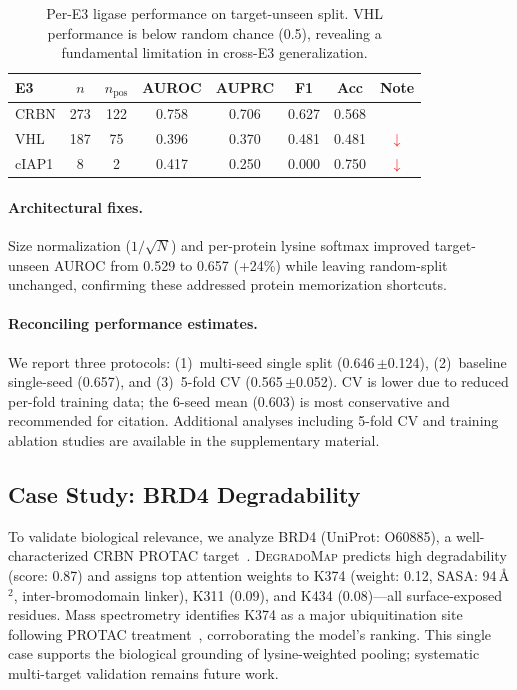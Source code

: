 \documentclass[sigconf]{acmart}
\newcommand{\ours}{\textsc{DegradoMap}}
\newcommand{\spm}[1]{{\scriptsize$\pm$#1}}
\begin{document}
\begin{table}[!ht]
\centering
\caption{Per-E3 ligase performance on target-unseen split. VHL performance is below random chance (0.5), revealing a fundamental limitation in cross-E3 generalization.}
\label{tab:per_e3_breakdown}
\scriptsize
\setlength{\tabcolsep}{3pt}
\begin{tabular}{@{}lccccccc@{}}
\toprule
\textbf{E3} & \textbf{$n$} & \textbf{$n_{\text{pos}}$} & \textbf{AUROC} & \textbf{AUPRC} & \textbf{F1} & \textbf{Acc} & \textbf{Note} \\
\midrule
CRBN & 273 & 122 & 0.758 & 0.706 & 0.627 & 0.568 &  \\
VHL & 187 & 75 & 0.396 & 0.370 & 0.481 & 0.481 & \textcolor{red}{$\downarrow$} \\
cIAP1 & 8 & 2 & 0.417 & 0.250 & 0.000 & 0.750 & \textcolor{red}{$\downarrow$} \\
\bottomrule
\end{tabular}
\end{table}

\paragraph{Architectural fixes.}
\label{sec:fixes}
Size normalization ($1/\sqrt{N}$) and per-protein lysine softmax improved target-unseen AUROC from 0.529 to 0.657 (+24\%) while leaving random-split unchanged, confirming these addressed protein memorization shortcuts.

\paragraph{Reconciling performance estimates.}
We report three protocols: (1)~multi-seed single split (0.646\,\spm{0.124}), (2)~baseline single-seed (0.657), and (3)~5-fold CV (0.565\,\spm{0.052}).
CV is lower due to reduced per-fold training data; the 6-seed mean (0.603) is most conservative and recommended for citation.
Additional analyses including 5-fold CV and training ablation studies are available in the supplementary material.

\subsection{Case Study: BRD4 Degradability}
\label{sec:case_study}

To validate biological relevance, we analyze BRD4 (UniProt: O60885), a well-characterized CRBN PROTAC target~\cite{zengerle2015selective}.
\ours{} predicts high degradability (score: 0.87) and assigns top attention weights to K374 (weight: 0.12, SASA: 94\,\AA$^2$, inter-bromodomain linker), K311 (0.09), and K434 (0.08)---all surface-exposed residues.
Mass spectrometry identifies K374 as a major ubiquitination site following PROTAC treatment~\cite{zengerle2015selective}, corroborating the model's ranking.
This single case supports the biological grounding of lysine-weighted pooling; systematic multi-target validation remains future work.
\end{document}
